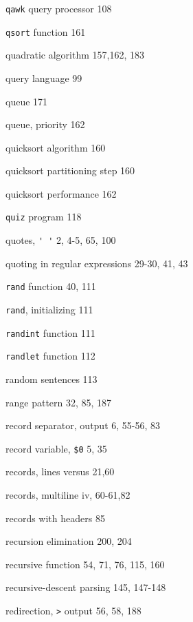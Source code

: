 \begin{multicols}{3}
\hangindent=3pc  \verb'qawk' query processor 108

\hangindent=3pc  \verb'qsort' function 161

\hangindent=3pc  quadratic algorithm 157,162, 183

\hangindent=3pc  query language 99

\hangindent=3pc  queue 171

\hangindent=3pc  queue, priority 162

\hangindent=3pc  quicksort algorithm 160

\hangindent=3pc  quicksort partitioning step 160

\hangindent=3pc  quicksort performance 162

\hangindent=3pc  \verb'quiz' program 118

\hangindent=3pc  quotes, \verb"' '" 2, 4-5, 65, 100

\hangindent=3pc  quoting in regular expressions 29-30, 41, 43

\hangindent=3pc  \verb'rand' function 40, 111

\hangindent=3pc  \verb'rand', initializing 111

\hangindent=3pc  \verb'randint' function 111

\hangindent=3pc  \verb'randlet' function 112

\hangindent=3pc  random sentences 113

\hangindent=3pc  range pattern 32, 85, 187

\hangindent=3pc  record separator, output 6, 55-56, 83

\hangindent=3pc  record variable, \verb'$0' 5, 35

\hangindent=3pc  records, lines versus 21,60

\hangindent=3pc  records, multiline iv, 60-61,82

\hangindent=3pc  records with headers 85

\hangindent=3pc  recursion elimination 200, 204

\hangindent=3pc  recursive function 54, 71, 76, 115, 160

\hangindent=3pc  recursive-descent parsing 145, 147-148

\hangindent=3pc  redirection, \verb'>' output 56, 58, 188


\end{multicols}

